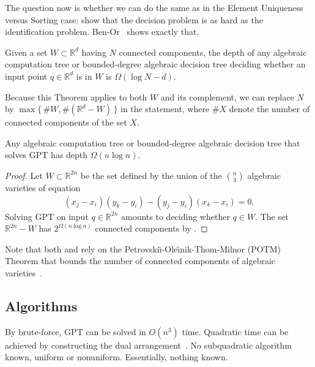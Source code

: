The question now is whether we can do the same as in the Element Uniqueness
versus Sorting case: show that the decision problem is as hard as the identification
problem. Ben-Or~\cite{Be83} shows exactly that.
%
\begin{theorem}[name=Ben-Or~\cite{Be83},label=thm:Be83]
    Given a set \(W \subset \mathbb{R}^d\) having \(N\) connected components,
    the depth of any algebraic
    computation tree or bounded-degree algebraic decision tree
    deciding whether an input point \(q \in \mathbb{R}^d\) is in \(W\)
    is \(\Omega(\log N - d)\).
\end{theorem}
%
Because this Theorem applies to both \(W\) and its complement, we can replace
\(N\) by \(\max \{\, \# W , \#(\mathbb{R}^d - W)\,\}\) in the statement,
where \(\# X\) denote the number of connected components of the set \(X\).

\begin{corollary}
    Any algebraic computation tree or bounded-degree algebraic decision tree
    that solves GPT has depth \(\Omega(n \log n)\).
\end{corollary}

\begin{proof}
    Let \(W \subset \mathbb{R}^{2n}\) be the set defined by the union of the
    \(n \choose 3\) algebraic varieties of equation
    \begin{displaymath}
	(x_j - x_i)(y_k - y_i) - (y_j - y_i)(x_k - x_i) = 0.
    \end{displaymath}
    Solving GPT on input \(q \in \mathbb{R}^{2n}\)
    amounts to deciding whether \(q \in W\).
    The set \(\mathbb{R}^{2n} - W\) has \(2^{\Omega(n \log n)}\) connected
    components by
    .
\end{proof}

Note that both
and
 rely on
the
Petrovski\u{\i}-Ole\u{\i}nik-Thom-Milnor (POTM) Theorem that
bounds the number of connected components of
algebraic varieties~\cite{Mi64,Th65,BPR06}.


\subsection{Algorithms}%
\label{sec:problem:pol:algorithms}

By brute-force, GPT can be solved in \(O(n^3)\) time.
%
Quadratic time can be achieved by constructing the dual
arrangement~\cite[Theorem 24.4.1]{Hal04}.
%
No subquadratic algorithm known, uniform or nonuniform.
%
Essentially, nothing known.


